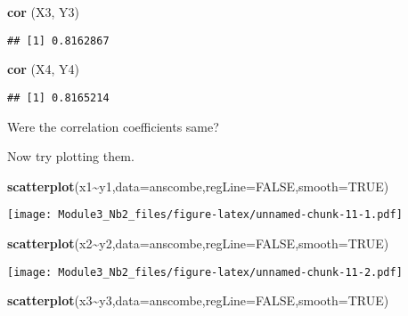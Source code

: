 \documentclass[
]{article}
\newenvironment{Shaded}{\begin{snugshade}}{\end{snugshade}}
\newcommand{\AttributeTok}[1]{\textcolor[rgb]{0.13,0.29,0.53}{#1}}
\newcommand{\ConstantTok}[1]{\textcolor[rgb]{0.56,0.35,0.01}{#1}}
\newcommand{\FunctionTok}[1]{\textcolor[rgb]{0.13,0.29,0.53}{\textbf{#1}}}
\newcommand{\NormalTok}[1]{#1}
\newcommand{\SpecialCharTok}[1]{\textcolor[rgb]{0.81,0.36,0.00}{\textbf{#1}}}
\begin{document}
\begin{Shaded}
\begin{Highlighting}[]
\FunctionTok{cor}\NormalTok{ (X3, Y3)}
\end{Highlighting}
\end{Shaded}

\begin{verbatim}
## [1] 0.8162867
\end{verbatim}

\begin{Shaded}
\begin{Highlighting}[]
\FunctionTok{cor}\NormalTok{ (X4, Y4)}
\end{Highlighting}
\end{Shaded}

\begin{verbatim}
## [1] 0.8165214
\end{verbatim}

Were the correlation coefficients same?

Now try plotting them.

\begin{Shaded}
\begin{Highlighting}[]
\FunctionTok{scatterplot}\NormalTok{(x1}\SpecialCharTok{\textasciitilde{}}\NormalTok{y1,}\AttributeTok{data=}\NormalTok{anscombe,}\AttributeTok{regLine=}\ConstantTok{FALSE}\NormalTok{,}\AttributeTok{smooth=}\ConstantTok{TRUE}\NormalTok{)}
\end{Highlighting}
\end{Shaded}

\texttt{[image: Module3\_Nb2\_files/figure-latex/unnamed-chunk-11-1.pdf]}

\begin{Shaded}
\begin{Highlighting}[]
\FunctionTok{scatterplot}\NormalTok{(x2}\SpecialCharTok{\textasciitilde{}}\NormalTok{y2,}\AttributeTok{data=}\NormalTok{anscombe,}\AttributeTok{regLine=}\ConstantTok{FALSE}\NormalTok{,}\AttributeTok{smooth=}\ConstantTok{TRUE}\NormalTok{)}
\end{Highlighting}
\end{Shaded}

\texttt{[image: Module3\_Nb2\_files/figure-latex/unnamed-chunk-11-2.pdf]}

\begin{Shaded}
\begin{Highlighting}[]
\FunctionTok{scatterplot}\NormalTok{(x3}\SpecialCharTok{\textasciitilde{}}\NormalTok{y3,}\AttributeTok{data=}\NormalTok{anscombe,}\AttributeTok{regLine=}\ConstantTok{FALSE}\NormalTok{,}\AttributeTok{smooth=}\ConstantTok{TRUE}\NormalTok{)}
\end{Highlighting}
\end{Shaded}
\end{document}
